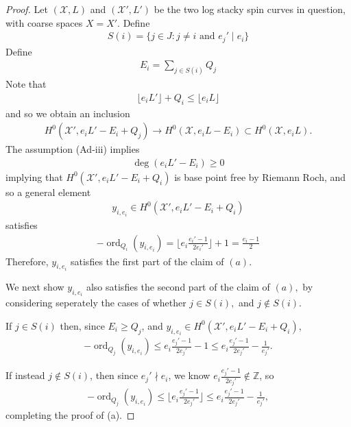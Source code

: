 \documentclass{amsart}
\theoremstyle{plain}
\theoremstyle{definition}
\theoremstyle{remark}
\numberwithin{equation}{section}
\newcommand\BZ{{\mathbb Z}}
\newcommand \sx{\mathscr X}
\DeclareMathOperator{\ord}{ord}
\newcommand \subhalf[1]{\frac{{#1} - 1}{2{#1}}}
\begin{document}
\begin{proof}
Let $(\sx,L)$ and $(\sx',L')$ be the two log stacky spin curves in question, with coarse spaces $X = X'$. Define
\begin{align*}
	S(i) = \{j \in J : j \neq i \text{ and }e_j' \mid e_i\}
\end{align*}
Define
\begin{align*}
	E_i = \sum_{j \in S(i)}^{}Q_j
\end{align*}
Note that
\begin{align*}
	\lfloor e_i L' \rfloor + Q_i \leq \lfloor e_i L \rfloor 
\end{align*}
and so we obtain an inclusion
\begin{align*}
	H^0(\sx',e_iL'-E_i + Q_j) \rightarrow H^0(\sx,e_iL - E_i) \subset H^0(\sx,e_iL).
\end{align*}
The assumption (Ad-iii) implies
\begin{align*}
	\deg \left( e_i L' - E_i \right) \geq 0
\end{align*}
implying that $H^0(\sx',e_iL'-E_i + Q_i)$ is base point free by Riemann Roch, and so a general element
\begin{align*}
	y_{i,e_i} \in H^0(\sx',e_iL'-E_i + Q_i)
\end{align*}
satisfies
\begin{align*}
	-\ord_{Q_i}(y_{i,e_i}) = \lfloor e_i \subhalf {e_i'} \rfloor +1 = \frac{e_i - 1}{2}
\end{align*}
Therefore, $y_{i,e_i}$ satisfies the first part of the claim of $(a)$.

We next show $y_{i,e_i}$ also satisfies the second part of the claim of $(a),$ by considering seperately the cases of whether $j \in S(i),$ and $j \notin S(i)$.

If $j \in S(i)$ then, since $E_i \geq Q_j$, and $y_{i,e_i} \in H^0(\sx',e_iL'-E_i + Q_i)$,
\begin{align*}
	-\ord_{Q_j}(y_{i,e_i}) \leq e_i\subhalf {e_j'} - 1 \leq e_i \subhalf{e_j'} - \frac{1}{e_j'}.
\end{align*}

If instead $j \notin S(i)$, then since $e_j' \nmid e_i$, we know $e_i\subhalf{e_j'} \notin \BZ$, so
\begin{align*}
	-\ord_{Q_j}(y_{i,e_i}) \leq \lfloor  e_i\subhalf{e_j'} \rfloor \leq e_i\subhalf{e_j'} - \frac{1}{e_j'},
\end{align*}
completing the proof of (a).


\end{proof}
\end{document}

